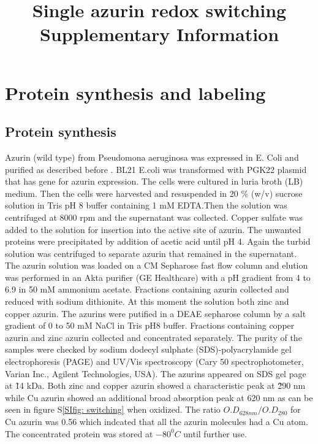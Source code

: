 \documentclass[11pt,a4paper,onecolumn]{article}
\newcommand*{\affaddr}[1]{#1} %
\newcommand*{\email}[1]{\texttt{#1}} %
\begin{document}

\date{\vspace{1ex}} %
\title{\textbf{Single azurin redox switching}\\ \vspace{3ex} Supplementary Information \vspace{3ex}}
\maketitle
\tableofcontents
\pagebreak
\section{Protein synthesis and labeling}
\subsection{Protein synthesis}
Azurin (wild type) from Pseudomona aeruginosa was expressed in E. Coli and purified as described before \cite{kamp1990purification}. BL21 E.coli was transformed with PGK22 plasmid that has gene for azurin expression. The cells were cultured in luria broth (LB) medium. Then the cells were harvested and resuspended in 20 \% (w/v) sucrose solution in Tris pH 8 buffer containing 1 mM EDTA.Then the solution was centrifuged at 8000 rpm and the supernatant was collected. Copper sulfate was added to the solution for insertion into the active site of azurin. The unwanted proteins were precipitated by addition of acetic acid until pH 4. Again the turbid solution was centrifuged to separate azurin that remained in the supernatant. The azurin solution was loaded on a CM Sepharose fast flow column and elution was performed in an Akta purifier (GE Healthcare) with a pH gradient from 4 to 6.9 in 50 mM ammonium acetate. Fractions containing azurin collected and reduced with sodium dithionite. At this moment the solution both zinc and copper azurin. The azurins were putified in a DEAE sepharose column by a salt gradient of 0 to 50 mM NaCl in Tris pH8 buffer. Fractions containing copper azurin and zinc azurin collected and concentrated separately. The purity of the samples were checked by sodium dodecyl sulphate (SDS)-polyacrylamide gel electrophoresis (PAGE) and UV/Vis spectroscopy (Cary 50 spectrophotometer, Varian Inc., Agilent Technologies, USA). The azurins appeared on SDS gel page at \~14 kDa. Both zinc and copper azurin showed a characteristic peak at \~290 nm while Cu azurin showed an additional broad absorption peak at 620 nm as can be seen in figure S\ref{SIfig: switching} when oxidized. The ratio $O.D_{628 nm}/O.D_{280}$ for Cu azurin was 0.56 which indcated that all the azurin molecules had a Cu atom. The concentrated protein was stored at $-80^0 C$ until further use.
\end{document}
